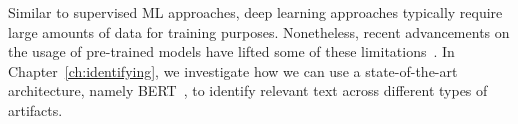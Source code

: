 

Similar to supervised \acs{ML} approaches, deep learning approaches 
typically require large amounts of data for training purposes.
Nonetheless, recent advancements on the usage of
pre-trained models 
have lifted some of these limitations~\cite{erhan2010pre-train}.
In Chapter~\ref{ch:identifying},
we investigate how we can use a state-of-the-art architecture, namely BERT~\cite{Devlin2018Bert},
to identify relevant text across different types of artifacts.
























